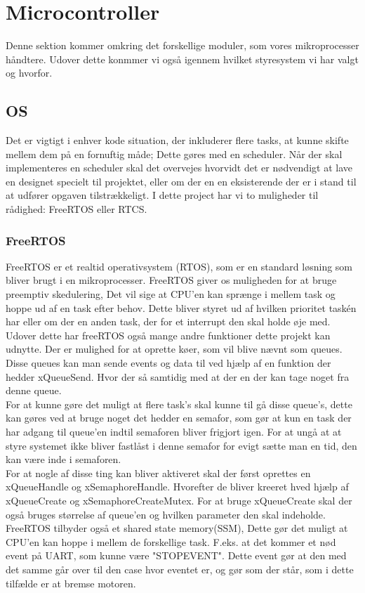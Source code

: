 \section{Microcontroller}

Denne sektion kommer omkring det forskellige moduler, som vores mikroprocesser håndtere. Udover dette konmmer vi også igennem hvilket styresystem vi har valgt og hvorfor.

\subsection{OS}
Det er vigtigt i enhver kode situation, der inkluderer flere tasks, at kunne skifte mellem dem på en fornuftig måde; Dette gøres med en scheduler. Når der skal implementeres en scheduler skal det overvejes hvorvidt det er nødvendigt at lave en designet specielt til projektet, eller om der en en eksisterende der er i stand til at udfører opgaven tilstrækkeligt. I dette project har vi to muligheder til rådighed: FreeRTOS\cite{FreeRTOSorg} eller RTCS.



\subsubsection{FreeRTOS}

FreeRTOS \cite{FreeRTOSorg} er et realtid operativsystem (RTOS), som er en standard løsning som bliver brugt i en mikroprocesser. FreeRTOS giver os muligheden for at bruge preemptiv skedulering, Det vil sige at CPU'en kan sprænge i mellem task og hoppe ud af en task efter behov. Dette bliver styret ud af hvilken prioritet taskén har eller om der en anden task, der for et interrupt den skal holde øje med.
\\
Udover dette har freeRTOS også mange andre funktioner dette projekt kan udnytte. Der er mulighed for at oprette køer, som vil blive nævnt som queues. Disse queues kan man sende events og data til ved hjælp af en funktion der hedder xQueueSend. Hvor der så samtidig med at der en der kan tage noget fra denne queue. 
\\
For at kunne gøre det muligt at flere task's skal kunne til gå disse queue's, dette kan gøres ved at bruge noget det hedder en semafor, som gør at kun en task der har adgang til queue'en indtil semaforen bliver frigjort igen. For at ungå at at styre systemet ikke bliver fastlåst i denne semafor for evigt sætte man en tid, den kan være inde i semaforen.
\\
For at nogle af disse ting kan bliver aktiveret skal der først oprettes en xQueueHandle og xSemaphoreHandle. Hvorefter de bliver kreeret hved hjælp af xQueueCreate og xSemaphoreCreateMutex. For at bruge xQueueCreate skal der også bruges størrelse af queue'en og hvilken parameter den skal indeholde.
\\
FreeRTOS tilbyder også et shared state memory(SSM), Dette gør det muligt at CPU'en kan hoppe i mellem de forskellige task. F.eks. at det kommer et nød event på UART, som kunne være "STOP\textunderscore EVENT". Dette event gør at den med det samme går over til den case hvor eventet er, og gør som der står, som i dette tilfælde er at bremse motoren.

